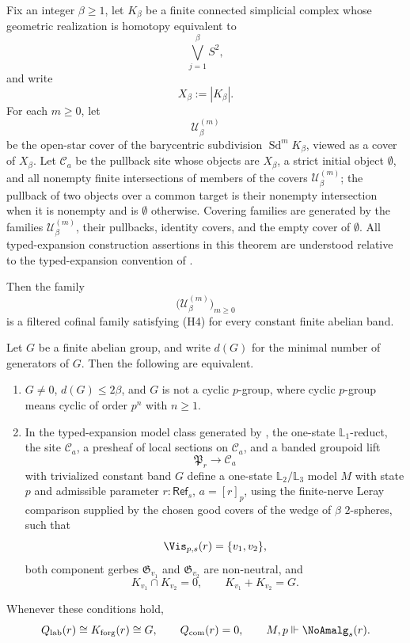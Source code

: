 \begin{theorem}\label{thm:wedge-sphere-two-component-label-loss}
Fix an integer $\beta\ge 1$, let $K_\beta$ be a finite connected simplicial complex whose geometric realization is homotopy equivalent to
\[
\bigvee_{j=1}^{\beta} S^2,
\]
and write
\[
X_\beta:=|K_\beta|.
\]
For each $m\ge 0$, let
\[
\mathcal U_\beta^{(m)}
\]
be the open-star cover of the barycentric subdivision $\operatorname{Sd}^m K_\beta$, viewed as a cover of $X_\beta$. Let $\mathcal C_a$ be the pullback site whose objects are $X_\beta$, a strict initial object $\emptyset$, and all nonempty finite intersections of members of the covers $\mathcal U_\beta^{(m)}$; the pullback of two objects over a common target is their nonempty intersection when it is nonempty and is $\emptyset$ otherwise. Covering families are generated by the families $\mathcal U_\beta^{(m)}$, their pullbacks, identity covers, and the empty cover of $\emptyset$.
All typed-expansion construction assertions in this theorem are understood relative to the
typed-expansion convention of
.

Then the family
\[
\bigl(\mathcal U_\beta^{(m)}\bigr)_{m\ge 0}
\]
is a filtered cofinal family satisfying \textup{(H4)} for every constant finite abelian band.

Let $G$ be a finite abelian group, and write $d(G)$ for the minimal number of generators of $G$. Then the following are equivalent.
\begin{enumerate}[label=(\roman*),nosep]
\item $G\ne0$, $d(G)\le 2\beta$, and $G$ is not a cyclic $p$-group, where
cyclic $p$-group means cyclic of order $p^n$ with $n\ge1$.
\item In the typed-expansion model class generated by
, the one-state
\(\mathbb L_1\)-reduct, the site \(\mathcal C_a\), a presheaf of local sections on
\(\mathcal C_a\), and a banded groupoid lift
\[
\mathfrak P_r\to \mathcal C_a
\]
with trivialized constant band $G$ define a one-state
\(\mathbb L_2/\mathbb L_3\) model \(M\) with state \(p\) and admissible
parameter \(r:\mathsf{Ref}_s\), \(a=[r]_p\), using the finite-nerve Leray
comparison supplied by the chosen good covers of the wedge of $\beta$ $2$-spheres, such that
\[
\Vis_{p,s}(r)=\{v_1,v_2\},
\]
both component gerbes $\mathfrak G_{v_1}$ and $\mathfrak G_{v_2}$ are non-neutral, and
\[
K_{v_1}\cap K_{v_2}=0,
\qquad
K_{v_1}+K_{v_2}=G.
\]
\end{enumerate}
Whenever these conditions hold,
\[
Q_{\mathrm{lab}}(r)\cong K_{\mathrm{forg}}(r)\cong G,
\qquad
Q_{\mathrm{com}}(r)=0,
\qquad
M,p\Vdash \NoAmalg_s(r).
\]
\end{theorem}

